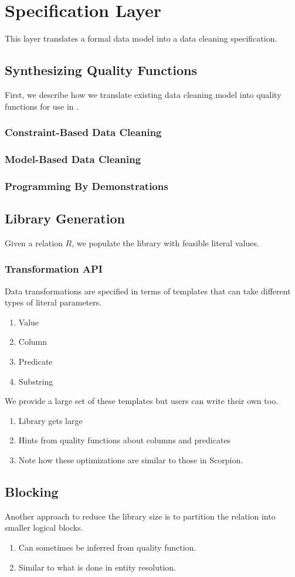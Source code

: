 \section{Specification Layer}
This layer translates a formal data model into a data cleaning specification.

\subsection{Synthesizing Quality Functions}
First, we describe how we translate existing data cleaning model into quality functions for use in \sys.

\subsubsection{Constraint-Based Data Cleaning}

\subsubsection{Model-Based Data Cleaning}

\subsubsection{Programming By Demonstrations}


\subsection{Library Generation}
Given a relation $R$, we populate the library with feasible literal values.

\subsubsection{Transformation API}
Data transformations are specified in terms of templates that can take different types of literal parameters.

\begin{enumerate}
    \item Value
    \item Column
    \item Predicate
    \item Substring
\end{enumerate}

We provide a large set of these templates but users can write their own too.


\begin{enumerate}
    \item Library gets large
    \item Hints from quality functions about columns and predicates
    \item Note how these optimizations are similar to those in Scorpion.
\end{enumerate}

\subsection{Blocking}
Another approach to reduce the library size is to partition the relation into smaller logical blocks.

\begin{enumerate}
    \item Can sometimes be inferred from quality function.
    \item Similar to what is done in entity resolution.
\end{enumerate}


